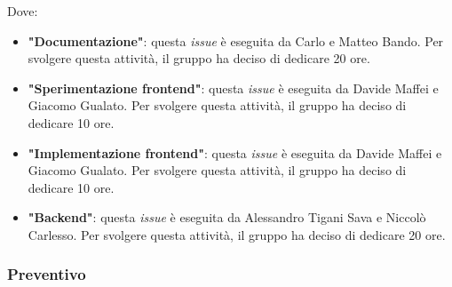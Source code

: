 Dove:
\begin{itemize}
	\item \textbf{"Documentazione"}: questa \textit{issue} è eseguita da
	      Carlo e Matteo Bando. Per svolgere questa attività, il gruppo ha deciso di
	      dedicare 20 ore.

	\item \textbf{"Sperimentazione frontend"}: questa \textit{issue} è eseguita
	      da Davide Maffei e Giacomo Gualato. Per svolgere questa attività, il
	      gruppo ha deciso di dedicare 10 ore.

	\item \textbf{"Implementazione frontend"}: questa \textit{issue} è eseguita
	      da Davide Maffei e Giacomo Gualato. Per svolgere questa attività, il
	      gruppo ha deciso di dedicare 10 ore.

	\item \textbf{"Backend"}: questa \textit{issue} è eseguita da Alessandro
	      Tigani Sava e Niccolò Carlesso. Per svolgere questa attività, il
	      gruppo ha deciso di dedicare 20 ore.
\end{itemize}

\subsubsection{Preventivo}

